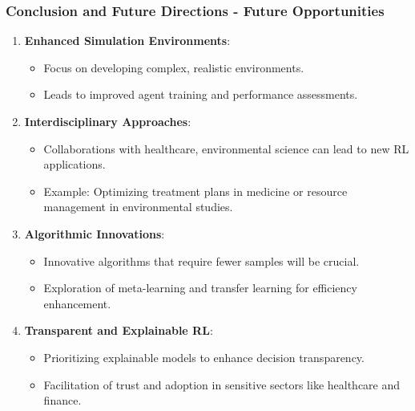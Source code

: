 \documentclass[aspectratio=169]{beamer}
\begin{document}
\begin{frame}[fragile]
  \frametitle{Conclusion and Future Directions - Future Opportunities}
  \begin{enumerate}
    \item \textbf{Enhanced Simulation Environments}:
    \begin{itemize}
      \item Focus on developing complex, realistic environments.
      \item Leads to improved agent training and performance assessments.
    \end{itemize}
    
    \item \textbf{Interdisciplinary Approaches}:
    \begin{itemize}
      \item Collaborations with healthcare, environmental science can lead to new RL applications.
      \item Example: Optimizing treatment plans in medicine or resource management in environmental studies.
    \end{itemize}
    
    \item \textbf{Algorithmic Innovations}:
    \begin{itemize}
      \item Innovative algorithms that require fewer samples will be crucial.
      \item Exploration of meta-learning and transfer learning for efficiency enhancement.
    \end{itemize}
    
    \item \textbf{Transparent and Explainable RL}:
    \begin{itemize}
      \item Prioritizing explainable models to enhance decision transparency.
      \item Facilitation of trust and adoption in sensitive sectors like healthcare and finance.
    \end{itemize}
  \end{enumerate}
\end{frame}
\end{document}
